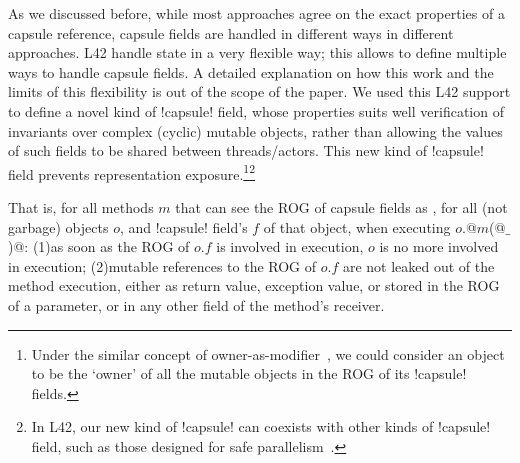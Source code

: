 

As we discussed before, while most approaches agree on the exact properties of a capsule reference,
capsule fields are handled in different ways in different approaches. L42 handle state in a very flexible way; this allows to define multiple ways to handle capsule fields. A detailed explanation on how this work and the limits of this flexibility is out of the scope of the paper.
We used this L42 support to define a novel kind of \Q!capsule! field,
whose properties suits well verification of invariants over complex (cyclic) mutable objects,
rather than allowing the values of such fields to be shared between threads/actors.
This new kind of \Q!capsule! field prevents representation exposure.\footnote{Under the similar concept of owner-as-modifier~\cite{Dietl05universes:lightweight,10.1007/978-3-540-92188-2_4}, we could consider an object to be the `owner' of all the mutable objects in the ROG of its \Q!capsule! fields.}\footnote{In L42, our new kind of \Q!capsule! can coexists with other kinds of \Q!capsule! field, such as those designed for safe parallelism~\cite{GordonEtAl12,clebsch2015deny,GIANNINI2019145}.}

That is, for all methods $m$ that can see the ROG of capsule fields as \Q@mut@,
for all (not garbage) objects $o$, and \Q!capsule! field's $f$ of that object,
when executing $o$\Q@.@$m$\Q@(@$\_$\Q@)@:
(1)as soon as the ROG of $o.f$ is involved in execution, $o$ is no more involved in execution;
(2)mutable references to the ROG of $o.f$ are not leaked out of the method execution, either as return value, exception value, or
stored in the ROG of a parameter, or in any other field of the method's receiver.

